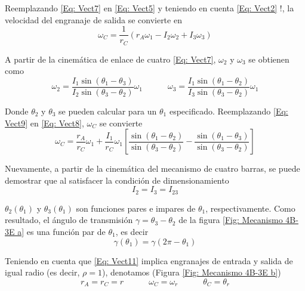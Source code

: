 \documentclass[12pt, final]{extarticle}
\begin{document}
Reemplazando \eqref{Eq: Vect7} en \eqref{Eq: Vect5} y teniendo en cuenta \eqref{Eq: Vect2} !, la velocidad del engranaje de salida se convierte en
\begin{equation}
   \omega_C=\frac{1}{r_C}(r_A\omega_1-I_2\omega_2+I_3\omega_3)
   \label{Eq: Vect8}
\end{equation}

A partir de la cinemática de enlace de cuatro \eqref{Eq: Vect7}, $\omega_2$ y $\omega_3$ se obtienen como
\begin{equation}
   \omega_2=\frac{I_1\sin({\theta_1-\theta_3})}{I_2\sin({\theta_3-\theta_2})}\omega_1  \quad\quad \quad   \omega_3=\frac{I_1\sin({\theta_1-\theta_2})}{I_3\sin({\theta_3-\theta_2})}\omega_1
   \label{Eq: Vect9}
\end{equation}

Donde $\theta_2$ y $\theta_3$ se pueden calcular para un $\theta_1$ especificado. Reemplazando
\eqref{Eq: Vect9} en \eqref{Eq: Vect8}, $\omega_C$ se convierte
\begin{equation}
   \omega_C=\frac{r_A}{r_C}\omega_1+\frac{I_1}{r_C}\omega_1[\frac{\sin({\theta_1-\theta_2})}{\sin({\theta_3-\theta_2})}-\frac{\sin({\theta_1-\theta_3})}{\sin({\theta_3-\theta_2})}]
   \label{Eq: Vect10}
\end{equation}

Nuevamente, a partir de la cinemática del mecanismo de cuatro barras, se puede demostrar que al satisfacer la condición de dimensionamiento
\begin{equation}
   I_2=I_3=I_{23}
   \label{Eq: Vect11}
\end{equation}

$\theta_2(\theta_1)$ y $\theta_3(\theta_1)$ son funciones pares e impares de $\theta_1$, respectivamente. Como resultado, el ángulo de transmisión $\gamma=\theta_3-\theta_2$ de la figura \ref{Fig: Mecanismo 4B-3E a} es una función par de $\theta_1$, es decir
\begin{equation}
   \gamma(\theta_1)=\gamma(2\pi-\theta_1)
   \label{Eq: Vect12}
\end{equation}

Teniendo en cuenta que \eqref{Eq: Vect11} implica engranajes de entrada y salida de igual radio (es decir, $\rho=1$), denotamos (Figura \ref{Fig: Mecanismo 4B-3E b})
\begin{equation}
   r_A=r_C=r\quad\quad\quad \omega_C=\omega_r    \quad\quad\quad \theta_C=\theta_r
   \label{Eq: Vect13}
\end{equation}
\end{document}
